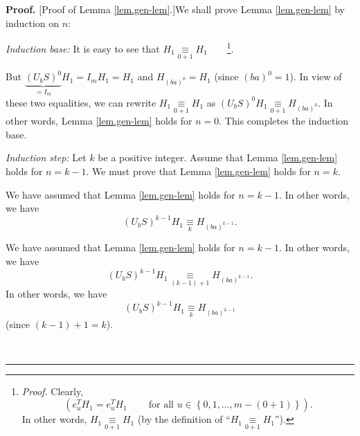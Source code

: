 \documentclass[numbers=enddot,12pt,final,onecolumn,notitlepage]{scrartcl}%
\theoremstyle{definition}
\newenvironment{proof}[1][Proof]{\noindent\textbf{#1.} }{\ \rule{0.5em}{0.5em}}
\newenvironment{verlong}{}{}
\newenvironment{vershort}{}{}
\begin{document}
\begin{proof}
[Proof of Lemma \ref{lem.gen-lem}.]We shall prove Lemma \ref{lem.gen-lem} by
induction on $n$:

\textit{Induction base:} It is easy to see that $H_{1}\underset{0+1}{\equiv
}H_{1}$\ \ \ \ \footnote{\textit{Proof.} Clearly,%
\[
\left(  e_{u}^{T}H_{1}=e_{u}^{T}H_{1}\ \ \ \ \ \ \ \ \ \ \text{for all }%
u\in\left\{  0,1,\ldots,m-\left(  0+1\right)  \right\}  \right)  .
\]
In other words, $H_{1}\underset{0+1}{\equiv}H_{1}$ (by the definition of
\textquotedblleft$H_{1}\underset{0+1}{\equiv}H_{1}$\textquotedblright).}.

But $\underbrace{\left(  U_{b}S\right)  ^{0}}_{=I_{m}}H_{1}=I_{m}H_{1}=H_{1}$
and $H_{\left(  ba\right)  ^{0}}=H_{1}$ (since $\left(  ba\right)  ^{0}=1$).
In view of these two equalities, we can rewrite $H_{1}\underset{0+1}{\equiv
}H_{1}$ as $\left(  U_{b}S\right)  ^{0}H_{1}\underset{0+1}{\equiv}H_{\left(
ba\right)  ^{0}}$. In other words, Lemma \ref{lem.gen-lem} holds for $n=0$.
This completes the induction base.

\textit{Induction step:} Let $k$ be a positive integer. Assume that Lemma
\ref{lem.gen-lem} holds for $n=k-1$. We must prove that Lemma
\ref{lem.gen-lem} holds for $n=k$.

\begin{vershort}
We have assumed that Lemma \ref{lem.gen-lem} holds for $n=k-1$. In other
words, we have%
\[
\left(  U_{b}S\right)  ^{k-1}H_{1}\underset{k}{\equiv}H_{\left(  ba\right)
^{k-1}}.
\]

\end{vershort}

\begin{verlong}
We have assumed that Lemma \ref{lem.gen-lem} holds for $n=k-1$. In other
words, we have%
\[
\left(  U_{b}S\right)  ^{k-1}H_{1}\underset{\left(  k-1\right)  +1}{\equiv
}H_{\left(  ba\right)  ^{k-1}}.
\]
In other words, we have%
\[
\left(  U_{b}S\right)  ^{k-1}H_{1}\underset{k}{\equiv}H_{\left(  ba\right)
^{k-1}}%
\]
(since $\left(  k-1\right)  +1=k$).
\end{verlong}


\end{proof}
\end{document}
